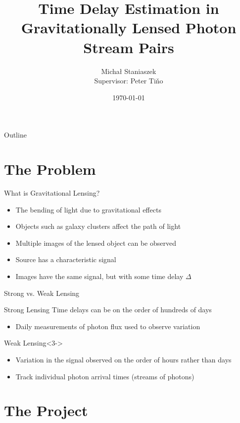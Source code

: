 \documentclass{beamer}
\title[Time Delay Estimation] %
{Time Delay Estimation in Gravitationally Lensed Photon Stream Pairs}
\author[Micha{\l} Staniaszek]{\large{Micha{\l} Staniaszek} \\ \scriptsize{Supervisor: Peter Ti\v{n}o}}
\institute[bham]{The University of Birmingham}
\date{\today}
\begin{document}
\begin{frame}
  \titlepage
\end{frame}

\begin{frame}{Outline}
  \tableofcontents
\end{frame}

\section{The Problem}

\begin{frame}{What is Gravitational Lensing?}
  \begin{itemize}[<+->]
  \item The bending of light due to gravitational effects
  \item Objects such as galaxy clusters affect the path of light
  \item Multiple images of the lensed object can be observed
  \item Source has a characteristic signal
  \item Images have the same signal, but with some time delay $\Delta$
  \end{itemize}
\end{frame}

\begin{frame}{Strong vs. Weak Lensing}
  \begin{block}{Strong Lensing}
    Time delays can be on the order of hundreds of days
      \begin{itemize}
    \item<2-> Daily measurements of photon flux used to observe variation
    \end{itemize}
  \end{block}
  \begin{block}{Weak Lensing}<3->
    \begin{itemize}
    \item<4-> Variation in the signal observed on the order of hours rather than days
    \item<5-> Track individual photon arrival times (streams of photons)
    \end{itemize}
  \end{block}
\end{frame}

\section{The Project}
\end{document}
